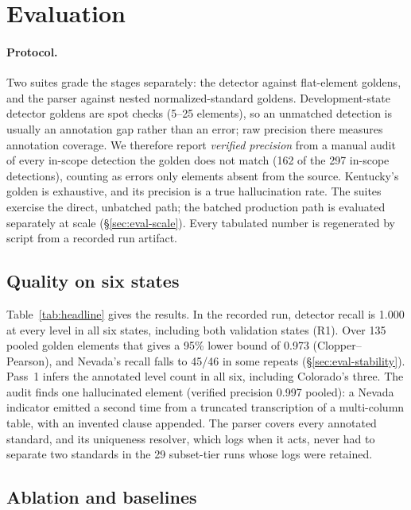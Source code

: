 \documentclass[letterpaper]{article} %
\begin{document}
\section{Evaluation}
\label{sec:eval}

\paragraph{Protocol.} Two suites grade the stages separately: the detector
against flat-element goldens, and the parser against nested
normalized-standard goldens. Development-state detector goldens are spot
checks (5--25 elements), so an unmatched detection is usually an annotation gap
rather than an error; raw precision there measures annotation coverage. We
therefore report \emph{verified precision} from a manual audit of every
in-scope detection the golden does not match (162 of the 297 in-scope
detections), counting as errors only elements absent from the source.
Kentucky's golden is exhaustive, and its precision is a true hallucination
rate. The suites exercise the direct, unbatched path; the batched production
path is evaluated separately at scale (\S\ref{sec:eval-scale}). Every
tabulated number is regenerated by script from a recorded run artifact.

\subsection{Quality on six states}
\label{sec:eval-headline}

Table~\ref{tab:headline} gives the results. In the recorded run, detector
recall is 1.000 at every level in all six states, including both validation
states (R1). Over 135 pooled golden elements that gives a 95\% lower bound of
0.973 (Clopper--Pearson), and Nevada's recall falls to 45/46 in some repeats
(\S\ref{sec:eval-stability}). Pass~1 infers the annotated level count in all
six, including Colorado's three. The audit finds one hallucinated element
(verified precision 0.997 pooled): a Nevada indicator emitted a second time
from a truncated transcription of a multi-column table, with an invented
clause appended. The parser covers every annotated standard, and its
uniqueness resolver, which logs when it acts, never had to separate two
standards in the 29 subset-tier runs whose logs were retained.

\subsection{Ablation and baselines}
\label{sec:eval-ablation}
\end{document}
